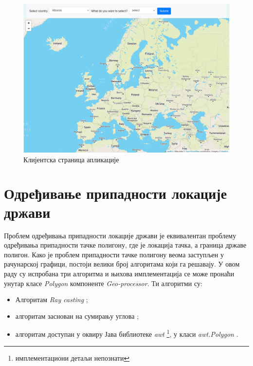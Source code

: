\documentclass[12pt,oneside]{memoir}
\begin{document}
\begin{figure}[!ht]
  \centering
  \includegraphics[width=1\textwidth]{pictures/geo_frontend.png}
  \caption{Клијентска страница апликације}
  \label{fig:app_front}
\end{figure}

\section{Одређивање припадности локације држави}
\label{sec:poly_cont}

Проблем одређивања припадности локације држави је еквивалентан проблему одређивања припадности тачке полигону, где је локација тачка, а граница државе полигон. Како је проблем припадности тачке полигону веома заступљен у рачунарској графици, постоји велики број алгоритама који га решавају. У овом раду су испробана три алгоритма и њихова имплементација се може пронаћи унутар класе \textit{Polygon} компоненте \textit{Geo-processor}. Ти алгоритми су:

\begin{itemize}
	\item Алгоритам \textit{Ray casting} \cite{inside_polygon};
	\item алгоритам заснован на сумирању углова \cite{inside_polygon};
	\item алгоритам доступан у оквиру Јава библиотеке \textit{awt} \footnote{имплементациони детаљи непознати}, у класи \textit{awt.Polygon} \cite{java_awt_polygon}.
\end{itemize}

\end{document}
